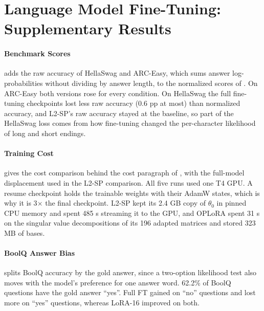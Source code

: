 \documentclass{article}
\newcommand{\apptable}[1]{\footnotesize\setlength{\tabcolsep}{3pt}}
\begin{document}
\section{Language Model Fine-Tuning: Supplementary Results}
\label{app:t1}

\paragraph{Benchmark Scores}
 adds the raw accuracy of HellaSwag and ARC-Easy, which sums answer log-probabilities without dividing by answer length, to the normalized scores of . On ARC-Easy both versions rose for every condition. On HellaSwag the full fine-tuning checkpoints lost less raw accuracy (0.6 pp at most) than normalized accuracy, and L2-SP's raw accuracy stayed at the baseline, so part of the HellaSwag loss comes from how fine-tuning changed the per-character likelihood of long and short endings.

\begin{table}[H]
  \centering
  \caption{Primary and raw accuracy (\%) for the seven evaluation conditions.}
  \label{tab:t1full}
  \apptable{tables/t1_bench_full.tex}
\end{table}

\paragraph{Training Cost}
 gives the cost comparison behind the cost paragraph of , with the full-model displacement used in the L2-SP comparison. All five runs used one T4 GPU. A resume checkpoint holds the trainable weights with their AdamW states, which is why it is 3$\times$ the final checkpoint. L2-SP kept its 2.4 GB copy of $\theta_0$ in pinned CPU memory and spent 485 s streaming it to the GPU, and OPLoRA spent 31 s on the singular value decompositions of its 196 adapted matrices and stored 323 MB of bases.

\begin{table}[H]
  \centering
  \caption{Trainable parameters, training time, peak GPU memory, checkpoint sizes, final displacement from $\theta_0$ and method-specific overhead for the five runs.}
  \label{tab:t1res}
  \apptable{tables/t1_resources.tex}
\end{table}

\paragraph{BoolQ Answer Bias}
 splits BoolQ accuracy by the gold answer, since a two-option likelihood test also moves with the model's preference for one answer word. 62.2\% of BoolQ questions have the gold answer ``yes''. Full FT gained on ``no'' questions and lost more on ``yes'' questions, whereas LoRA-16 improved on both.
\end{document}
